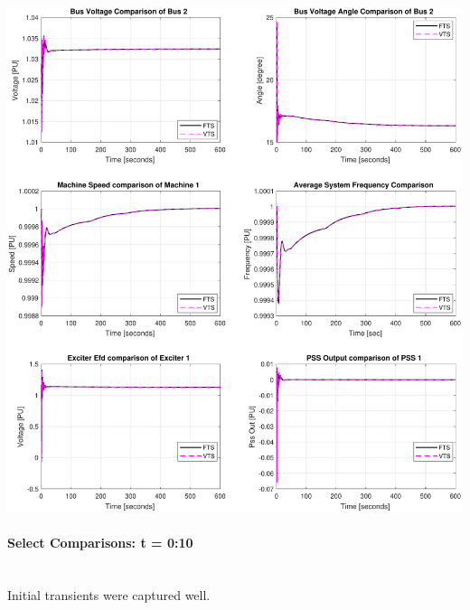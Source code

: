 \documentclass[12pt]{article}
\begin{document}
\includegraphics[width=\linewidth]{MWdetailFull}

\pagebreak
\paragraph{Select Comparisons: t = 0:10} \ \\
Initial transients were captured well.\\
\end{document}
